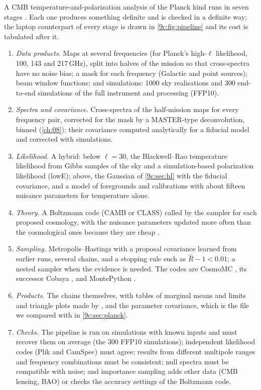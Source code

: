 A CMB temperature-and-polarization analysis of the Planck kind runs in seven stages
\cite{Planck2018V,Planck2018VI}. Each one produces something definite and is checked in a definite way; the laptop
counterpart of every stage is drawn in \cref{9c:fig:pipeline} and its cost is tabulated after it.
\begin{enumerate}[itemsep=2pt]
  \item \emph{Data products.} Maps at several frequencies (for Planck's high-$\ell$ likelihood, 100, 143 and 217\,GHz),
        split into halves of the mission so that cross-spectra have no noise bias; a mask for each frequency (Galactic
        and point sources); beam window functions; and simulations: 1000 sky realisations and 300 end-to-end
        simulations of the full instrument and processing (FFP10).
  \item \emph{Spectra and covariance.} Cross-spectra of the half-mission maps for every frequency pair, corrected for the
        mask by a MASTER-type deconvolution, binned (\cref{ch:08}); their covariance computed analytically for a fiducial
        model and corrected with simulations.
  \item \emph{Likelihood.} A hybrid: below $\ell=30$, the Blackwell--Rao temperature likelihood from Gibbs samples of the
        sky and a simulation-based polarization likelihood (lowE); above, the Gaussian of \cref{9c:sec:hl} with the
        fiducial covariance, and a model of foregrounds and calibrations with about fifteen nuisance parameters for
        temperature alone.
  \item \emph{Theory.} A Boltzmann code (CAMB or CLASS) called by the sampler for each proposed cosmology, with the
        nuisance parameters updated more often than the cosmological ones because they are cheap
        \cite{LewisBridle2002}.
  \item \emph{Sampling.} Metropolis--Hastings with a proposal covariance learned from earlier runs, several chains, and a
        stopping rule such as $\hat R-1<0.01$; a nested sampler when the evidence is needed. The codes are CosmoMC
        \cite{LewisBridle2002}, its successor Cobaya \cite{Torrado2021}, and MontePython \cite{Audren2013}.
  \item \emph{Products.} The chains themselves, with tables of marginal means and limits and triangle plots made by
         \cite{Lewis2019GetDist}, and the parameter covariance, which is the file we compared with in
        \cref{9c:sec:planck}.
  \item \emph{Checks.} The pipeline is run on simulations with known inputs and must recover them on average (the
        300 FFP10 simulations); independent likelihood codes (Plik and CamSpec) must agree; results from different
        multipole ranges and frequency combinations must be consistent; null spectra must be compatible with noise;
        and importance sampling adds other data (CMB lensing, BAO) or checks the accuracy settings of the Boltzmann code.
\end{enumerate}

